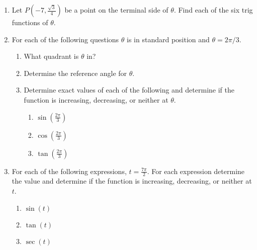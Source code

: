 \begin{enumerate}

\item Let $P(-7,\frac{\sqrt{3}}{4})$ be a point on the terminal side of $\theta$.  Find each of the six trig functions of $\theta$.\begin{enumerate}
\end{enumerate}
\vfill

\item For each of the following questions $\theta$ is in standard
  position and  $\theta=2\pi/3$.
\begin{enumerate}
\item  What quadrant is $\theta$ in?
  \vfill
\item Determine the reference angle for $\theta$.
  \vfill
\item Determine exact values of each of the following and determine if
  the function is increasing, decreasing, or neither at $\theta$.
  \begin{enumerate}
  \item $\sin\left(\frac{2\pi}{3}\right)$
    \vfill
  \item $\cos\left(\frac{2\pi}{3}\right)$
    \vfill
  \item $\tan\left(\frac{2\pi}{3}\right)$
    \vfill
  \end{enumerate}

\end{enumerate}

\clearpage
\item For each of the following expressions, $t=\frac{7\pi}{2}$. For
  each expression determine the value and determine if the function is
  increasing, decreasing, or neither at $t$.
\begin{enumerate}
\item $\sin(t)$ \vfill
\item $\tan(t)$ \vfill
\item $\sec(t)$ \vfill
\end{enumerate}



\end{enumerate}
